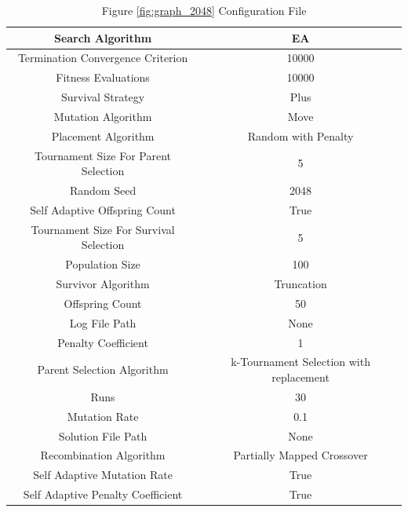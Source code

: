 \documentclass{standalone}
\begin{document}
\begin{table}[!htb]
	\centering
	\caption{Figure \ref{fig:graph_2048} Configuration File}
	\label{tab:graph_2048}
	\begin{tabular}{| c | c |}
		\hline
		Search Algorithm		& EA		 \\
		\hline
		Termination Convergence Criterion		& 10000		 \\
		\hline
		Fitness Evaluations		& 10000		 \\
		\hline
		Survival Strategy		& Plus		 \\
		\hline
		Mutation Algorithm		& Move		 \\
		\hline
		Placement Algorithm		& Random with Penalty		 \\
		\hline
		Tournament Size For Parent Selection		& 5		 \\
		\hline
		Random Seed		& 2048		 \\
		\hline
		Self Adaptive Offspring Count		& True		 \\
		\hline
		Tournament Size For Survival Selection		& 5		 \\
		\hline
		Population Size		& 100		 \\
		\hline
		Survivor Algorithm		& Truncation		 \\
		\hline
		Offspring Count		& 50		 \\
		\hline
		Log File Path		& None		 \\
		\hline
		Penalty Coefficient		& 1		 \\
		\hline
		Parent Selection Algorithm		& k-Tournament Selection with replacement		 \\
		\hline
		Runs		& 30		 \\
		\hline
		Mutation Rate		& 0.1		 \\
		\hline
		Solution File Path		& None		 \\
		\hline
		Recombination Algorithm		& Partially Mapped Crossover		 \\
		\hline
		Self Adaptive Mutation Rate		& True		 \\
		\hline
		Self Adaptive Penalty Coefficient		& True		 \\
		\hline
	\end{tabular}
\end{table}
\end{document}
